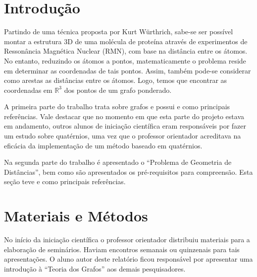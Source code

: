 \documentclass[
	12pt,				%
	openright,			%
	twoside,			%
	a4paper,			%
	english,			%
	french,				%
	spanish,			%
	brazil				%
	]{abntex2}
\begin{document}
\tableofcontents*
\cleardoublepage



\textual

\chapter[Introdução]{Introdução}

Partindo de uma técnica proposta por Kurt Würthrich, sabe-se ser possível montar a estrutura 3D de uma molécula de proteína através de experimentos de Ressonância Magnética Nuclear (RMN), com base na distância entre os átomos. No entanto, reduzindo os átomos a pontos, matematicamente o problema reside em determinar as coordenadas de tais pontos. Assim, também pode-se considerar como arestas as distâncias entre os átomos. Logo, temos que encontrar as coordenadas em $\mathbb{R}^3$ dos pontos de um grafo ponderado. 

A primeira parte do trabalho trata sobre grafos e possui \cite{grafos} e \cite{grafos1} como principais referências. Vale destacar que no momento em que esta parte do projeto estava em andamento, outros alunos de iniciação científica eram responsáveis por fazer um estudo sobre quatérnios, uma vez que o professor orientador acreditava na eficácia da implementação de um método baseado em quatérnios.

Na segunda parte do trabalho é apresentado o ``Problema de Geometria de Distâncias'', bem como são apresentados os pré-requisitos para compreensão. Esta seção teve \cite{tese} e \cite{1} como principais referências.  

\chapter{Materiais e Métodos}
No início da iniciação científica o professor orientador distribuiu materiais para a elaboração de seminários. Haviam encontros semanais ou quinzenais para tais apresentações. O aluno autor deste relatório ficou responsável por apresentar uma introdução à ``Teoria dos Grafos'' aos demais pesquisadores.
\end{document}
